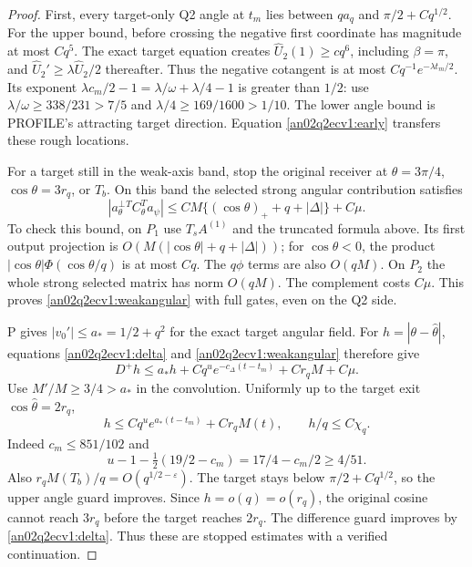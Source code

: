 \documentclass[11pt]{article}
\theoremstyle{remark}\newtheorem{remark}[theorem]{Remark}
\newcommand{\eps}{\varepsilon}
\begin{document}
\begin{proof}
First, every target-only Q2 angle at $t_m$ lies between $qa_q$
and $\pi/2+Cq^{1/2}$.
For the upper bound, before crossing the negative first coordinate
has magnitude at most $Cq^5$. The exact target equation creates
$\widehat U_2(1)\ge cq^6$, including $\beta=\pi$, and
$\widehat U_2'\ge\lambda\widehat U_2/2$ thereafter.
Thus the negative cotangent is at most $Cq^{-1}e^{-\lambda t_m/2}$.
Its exponent $\lambda c_m/2-1=\lambda/\omega+\lambda/4-1$
is greater than $1/2$: use $\lambda/\omega\ge338/231>7/5$
and $\lambda/4\ge169/1600>1/10$.
The lower angle bound is PROFILE's attracting target direction.
Equation \eqref{an02q2ecv1:early} transfers these rough locations.

For a target still in the weak-axis band, stop the original
receiver at $\theta=3\pi/4$, $\cos\theta=3r_q$, or $T_b$.
On this band the selected strong angular contribution satisfies
\begin{equation}
 |a_\theta^\perp{}^T C_\theta^T a_\psi|
 \le C M\{(\cos\theta)_++q+|\Delta|\}+C\mu .
 \label{an02q2ecv1:weakangular}
\end{equation}
To check this bound, on $P_1$ use $T_s A^{(1)}$ and the
truncated formula above. Its first output projection is
$O(M(|\cos\theta|+q+|\Delta|))$;
for $\cos\theta<0$, the product
$|\cos\theta|\Phi(\cos\theta/q)$ is at most $Cq$.
The $q\phi$ terms are also $O(qM)$.
On $P_2$ the whole strong selected matrix has norm $O(qM)$.
The complement costs $C\mu$. This proves \eqref{an02q2ecv1:weakangular}
with full gates, even on the Q2 side.

P gives $|v_0'|\le a_*=1/2+q^2$ for the exact target angular field.
For $h=|\theta-\widehat\theta|$, equations
\eqref{an02q2ecv1:delta} and \eqref{an02q2ecv1:weakangular}
therefore give
\[
 D^+h\le a_*h+Cq^u e^{-c_\Delta(t-t_m)}
                  +Cr_q M+C\mu .
\]
Use $M'/M\ge3/4>a_*$ in the convolution.
Uniformly up to the target exit $\cos\widehat\theta=2r_q$,
\begin{equation}
 h\le Cq^u e^{a_*(t-t_m)}+Cr_q M(t),\qquad
 h/q\le C\chi_q .
 \label{an02q2ecv1:weakh}
\end{equation}
Indeed $c_m\le851/102$ and
\[
 u-1-\tfrac12(19/2-c_m)=17/4-c_m/2\ge4/51.
\]
Also $r_q M(T_b)/q=O(q^{1/2-\eps})$.
The target stays below $\pi/2+Cq^{1/2}$, so the upper angle
guard improves. Since $h=o(q)=o(r_q)$, the original cosine
cannot reach $3r_q$ before the target reaches $2r_q$.
The difference guard improves by \eqref{an02q2ecv1:delta}.
Thus these are stopped estimates with a verified continuation.


\end{proof}
\end{document}
